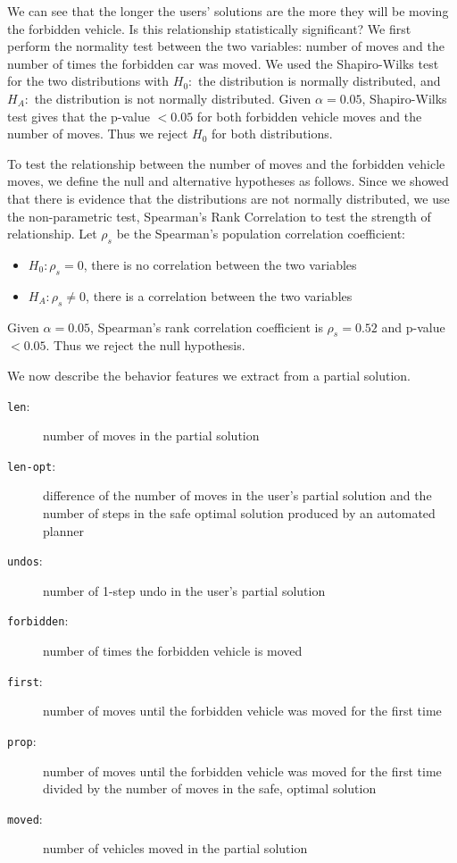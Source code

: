 We can see that the longer the users' solutions are the more they will be moving the forbidden vehicle. Is this relationship statistically significant? We first perform the normality test between the two variables: number of moves and the number of times the forbidden car was moved. We used the Shapiro-Wilks test for the two distributions with $H_0:$ the distribution is normally distributed, and $H_A:$ the distribution is not normally distributed. Given $\alpha=0.05$, Shapiro-Wilks test gives that the p-value $<0.05$ for both forbidden vehicle moves and the number of moves. Thus we reject $H_0$ for both distributions.

To test the relationship between the number of moves and the forbidden vehicle moves, we define the null and alternative hypotheses as follows. Since we showed that there is evidence that the distributions are not normally distributed, we use the non-parametric test, Spearman's Rank Correlation to test the strength of relationship. Let $\rho_s$ be the Spearman's population correlation coefficient:
\begin{itemize}
\item $H_0: \rho_s=0$, there is no correlation between the two variables
\item $H_A: \rho_s\neq0$, there is a correlation between the two variables
\end{itemize}
Given $\alpha=0.05$, Spearman's rank correlation coefficient is $\rho_s=0.52$ and p-value $<0.05$. Thus we reject the null hypothesis.

We now describe the behavior features we extract from a partial solution.
\begin{description}
\item[\texttt{len}:] number of moves in the partial solution
\item[\texttt{len-opt}:] difference of the number of moves in the user's partial solution and the number of steps in the safe optimal solution produced by an automated planner
\item[\texttt{undos}:] number of 1-step undo in the user's partial solution
\item[\texttt{forbidden}:] number of times the forbidden vehicle is moved
\item[\texttt{first}:] number of moves until the forbidden vehicle was moved for the first time
\item[\texttt{prop}:] number of moves until the forbidden vehicle was moved for the first time divided by the number of moves in the safe, optimal solution
\item[\texttt{moved}:] number of vehicles moved in the partial solution
\end{description}

